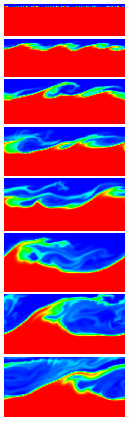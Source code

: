 \documentclass[final]{siamltex}
\begin{document}
\begin{figure}
\begin{center}
\includegraphics[width=2.5in]{KHLM0}
\includegraphics[width=2.5in]{KHLM1}
\includegraphics[width=2.5in]{KHLM2}
\includegraphics[width=2.5in]{KHLM3}
\includegraphics[width=2.5in]{KHLM4}
\includegraphics[width=2.5in]{KHLM5}
\includegraphics[width=2.5in]{KHLM6}
\includegraphics[width=2.5in]{KHLM7}

\end{center}
\end{figure}
\end{document}

